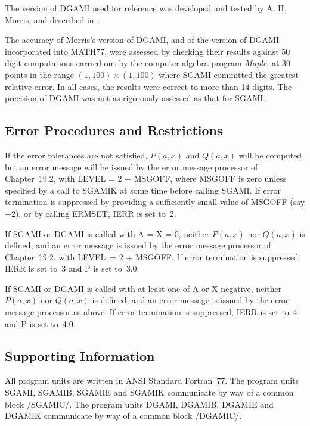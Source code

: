 \documentclass[twoside]{MATH77}
\begin{document}
The version of DGAMI used for reference was developed and tested by A. H.
Morris, and described in \cite{DiDonato:1986:CIG}.

The accuracy of Morris's version of DGAMI, and of the version of DGAMI
incorporated into MATH77, were assessed by checking their results against 50
digit computations carried out by the computer algebra program {\em Maple},
at 30 points in the range $(1, 100) \times (1, 100)$ where SGAMI
committed the greatest relative error.  In all cases, the results were
correct to more than 14 digits.  The precision of DGAMI was not as
rigorously assessed as that for SGAMI.




\subsection{Error Procedures and Restrictions}

If the error tolerances are not satisfied, $P(a,x)$ and $Q(a,x)$
will be computed, but an error message will be issued by the error message
processor of Chapter~19.2, with LEVEL = 2 + MSGOFF, where MSGOFF
is zero unless specified by a call to SGAMIK at some time before calling
SGAMI. If error termination is suppressed by providing a sufficiently small
value of MSGOFF (say $-$2), or by calling ERMSET, IERR is set to~2.

If SGAMI or DGAMI is called with A = X = 0, neither $P(a,x)$ nor $%
Q(a,x)$ is defined, and an error message is issued by the error message
processor of Chapter~19.2, with LEVEL\ = 2 + MSGOFF. If error
termination is suppressed, IERR is set to~3 and P is set to~3.0.

If SGAMI or DGAMI is called with at least one of A or X negative, neither $%
P(a,x)$ nor $Q(a,x)$ is defined, and an error message is issued by the
error message processor as above.
If error termination is suppressed, IERR is set to~4 and P is set to~4.0.

\subsection{Supporting Information}

All program units are written in ANSI Standard Fortran~77.
The program units SGAMI, SGAMIB, SGAMIE and SGAMIK communicate by way of a
common block /SGAMIC/. The program units DGAMI, DGAMIB, DGAMIE and DGAMIK
communicate by way of a common block /DGAMIC/.
\end{document}
